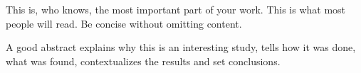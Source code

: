 \noindent
This is, who knows, the most important part of your work.
This is what most people will read.
Be concise without omitting content.

A good abstract explains why this is an interesting study, tells how it was done, what was found, contextualizes the results and set conclusions.


\newpage


\tableofcontents

\listoffigures

\listoftables

\printnomenclature
